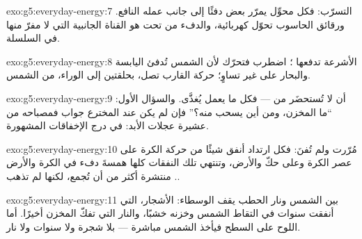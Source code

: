 \begin{solution}{exo:g5:everyday-energy:7}
التسرّب: فكل محوِّل يمرّر بعض  دفئًا إلى جانب عمله
النافع. ورقائق الحاسوب تحوّل  كهربائية، والدفء من تحت هو
القناة الجانبية التي لا مفرّ منها في السلسلة.
\end{solution}

\begin{solution}{exo:g5:everyday-energy:8}
الأشرعة تدفعها ؛   اضطرب فتحرّك لأن الشمس تُدفئ
اليابسة والبحار على غير تساوٍ؛  حركة القارب تصل، بحلقتين
إلى الوراء، من  الشمس.
\end{solution}

\begin{solution}{exo:g5:everyday-energy:9}
أن  لا تُستحضَر من  --- فكل ما يعمل يُغذَّى. والسؤال
الأول: ``ما المخزن، ومن أين يسحب  منه؟'' فإن لم يكن عند
المخترع جواب فمصباحه من عشيرة عجلات الأبد: في درج الإخفاقات
المشهورة.
\end{solution}

\begin{solution}{exo:g5:everyday-energy:10}
مُرّرت  ولم تُفنَ: فكل ارتداد أنفق شيئًا من  حركة
الكرة على عصر الكرة وعلى حكّ  والأرض، وتنتهي تلك النفقات
كلها همسةَ دفء في الكرة والأرض . منتشرة أكثر من أن
تُجمع، لكنها لم تذهب.
\end{solution}

\begin{solution}{exo:g5:everyday-energy:11}
بين الشمس ونار الحطب يقف الوسطاء: الأشجار، التي أنفقت سنوات في
التقاط  الشمس وخزنه خشبًا، والنار التي تفكّ المخزن أخيرًا.
أما اللوح على السطح فيأخذ   الشمس مباشرة --- بلا شجرة
ولا سنوات ولا نار.
\end{solution}
